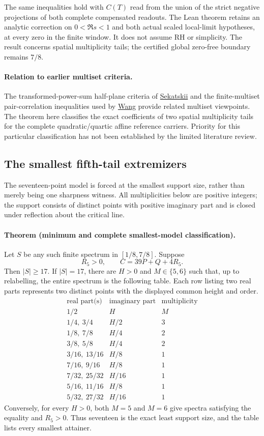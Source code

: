 The same inequalities hold with \(C(T)\) read from the union of the
strict negative projections of both complete compensated readouts.
The Lean theorem retains an analytic correction on \(0<\Re s<1\)
and both actual scaled local-limit hypotheses, at every zero in the
finite window. It does not assume RH or simplicity.
The result concerns spatial multiplicity tails; the certified global
zero-free boundary remains \(7/8\).

\paragraph{Relation to earlier multiset criteria.}
The transformed-power-sum half-plane criteria of
\href{https://arxiv.org/abs/1304.7895}{Sekatskii} and the finite-multiset
pair-correlation inequalities used by
\href{https://arxiv.org/html/2609.07918v2}{Wang}
provide related multiset viewpoints.
The theorem here classifies the exact coefficients of two spatial
multiplicity tails for the complete quadratic/quartic affine reference
carriers. Priority for this particular classification has not been
established by the limited literature review.

\subsection{The smallest fifth-tail extremizers}
\label{sec:minimal-fifth-carrier}

The seventeen-point model is forced at the smallest support size, rather
than merely being one sharpness witness. All multiplicities below are
positive integers; the support consists of distinct points with positive
imaginary part and is closed under reflection about the critical line.

\paragraph{Theorem (minimum and complete smallest-model classification).}
Let \(S\) be any such finite spectrum in \([1/8,7/8]\). Suppose
\[
 R_5>0,\qquad C=39P+Q+4R_5.
\]
Then \(|S|\ge17\). If \(|S|=17\), there are \(H>0\) and
\(M\in\{5,6\}\) such that, up to relabelling, the entire spectrum is
the following table. Each row listing two real parts represents two
distinct points with the displayed common height and order.
\[
\begin{array}{c|c|c}
 \text{real part(s)}&\text{imaginary part}&\text{multiplicity}\\ \hline
 1/2&H&M\\
 1/4,\ 3/4&H/2&3\\
 1/8,\ 7/8&H/4&2\\
 3/8,\ 5/8&H/4&2\\
 3/16,\ 13/16&H/8&1\\
 7/16,\ 9/16&H/8&1\\
 7/32,\ 25/32&H/16&1\\
 5/16,\ 11/16&H/8&1\\
 5/32,\ 27/32&H/16&1
\end{array}
\]
Conversely, for every \(H>0\), both \(M=5\) and \(M=6\) give
spectra satisfying the equality and \(R_5>0\). Thus seventeen is the
exact least support size, and the table lists every smallest attainer.

